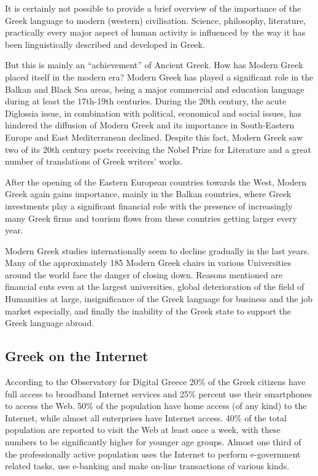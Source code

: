 \begin{multicols}{2}
It is certainly not possible to provide a brief overview of the importance of the Greek language to modern (western) civilisation. Science, philosophy, literature, practically every major aspect of human activity is influenced by the way it has been linguistically described and developed in Greek.

But this is mainly an “achievement” of Ancient Greek. How has Modern Greek placed itself in the modern era? Modern Greek has played a significant role in the Balkan and Black Sea areas, being a major commercial and education language during at least the 17th-19th centuries. During the 20th century, the acute Diglossia issue, in combination with political, economical and social issues, has hindered the diffusion of Modern Greek and its importance in South-Eastern Europe and East Mediterranean declined. Despite this fact, Modern Greek saw two of its 20th century poets receiving the Nobel Prize for Literature and a great number of translations of Greek writers’ works.

After the opening of the Eastern European countries towards the West, Modern Greek again gains importance, mainly in the Balkan countries, where Greek investments play a significant financial role with the presence of increasingly many Greek firms and tourism flows from these countries getting larger every year. 

Modern Greek studies internationally seem to decline gradually in the last years. Many of the approximately 185 Modern Greek chairs in various Universities around the world face the danger of closing down. Reasons mentioned are financial cuts even at the largest universities, global deterioration of the field of Humanities at large, insignificance of the Greek language for business and the job market especially, and finally the inability of the Greek state to support the Greek language abroad.

\subsection{Greek on the Internet}

According to the Observatory for Digital Greece \cite{Obs1} 20\% of the Greek citizens have full access to broadband Internet services and 25\% percent use their smartphones to access the Web. 50\% of the population have home access (of any kind) to the Internet, while almost all enterprises have Internet access. 40\% of the total population are reported to visit the Web at least once a week, with these numbers to be significantly higher for younger age groups. Almost one third of the professionally active population uses the Internet to perform e-government related tasks, use e-banking and make on-line transactions of various kinds.


\end{multicols}
